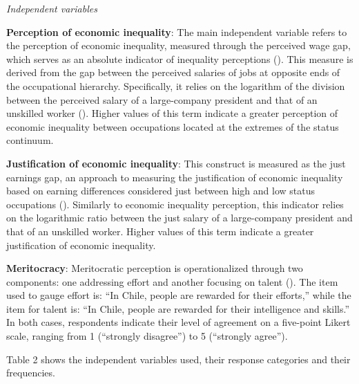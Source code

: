 \documentclass[
  12pt,
]{article}
\begin{document}
\emph{Independent variables}

\textbf{Perception of economic inequality}: The main independent
variable refers to the perception of economic inequality, measured
through the perceived wage gap, which serves as an absolute indicator of
inequality perceptions (). This measure is derived from the gap between the
perceived salaries of jobs at opposite ends of the occupational
hierarchy. Specifically, it relies on the logarithm of the division
between the perceived salary of a large-company president and that of an
unskilled worker (). Higher
values of this term indicate a greater perception of economic inequality
between occupations located at the extremes of the status continuum.

\textbf{Justification of economic inequality}: This construct is
measured as the just earnings gap, an approach to measuring the
justification of economic inequality based on earning differences
considered just between high and low status occupations
(). Similarly to economic
inequality perception, this indicator relies on the logarithmic ratio
between the just salary of a large-company president and that of an
unskilled worker. Higher values of this term indicate a greater
justification of economic inequality.

\textbf{Meritocracy}: Meritocratic perception is operationalized through
two components: one addressing effort and another focusing on talent
(). The item used to gauge
effort is: ``In Chile, people are rewarded for their efforts,'' while
the item for talent is: ``In Chile, people are rewarded for their
intelligence and skills.'' In both cases, respondents indicate their
level of agreement on a five-point Likert scale, ranging from 1
(``strongly disagree'') to 5 (``strongly agree'').

Table 2 shows the independent variables used, their response categories
and their frequencies.
\end{document}
